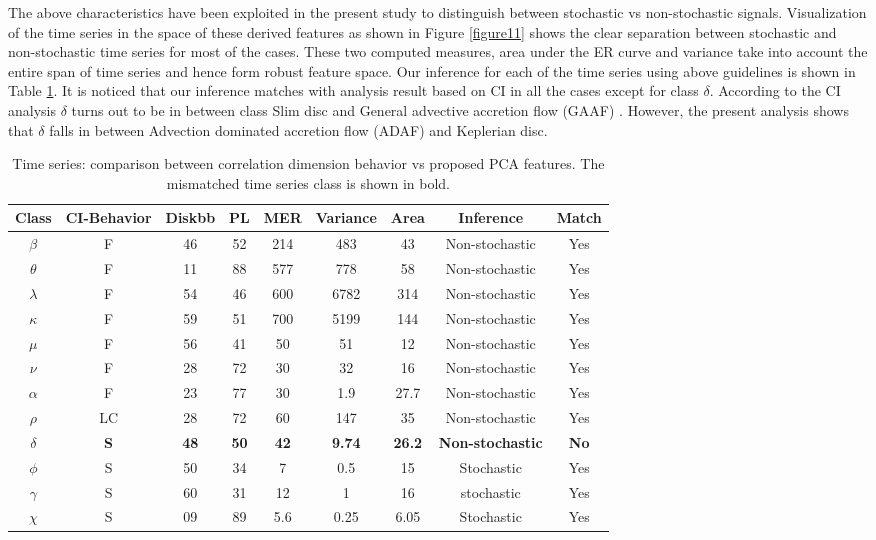 \documentclass[10pt,conference]{IEEEtran}
\begin{document}
The above characteristics have been exploited in the present study to distinguish between stochastic vs non-stochastic signals. Visualization of the time series in the space of these derived features as shown in Figure \ref{figure11} shows the clear separation between stochastic and non-stochastic time series for most of the cases. These two computed measures, area under the ER curve and variance take into account the entire span of time series and hence form robust feature space. Our inference for each of the time series using above guidelines is shown in Table \ref{tab:results}. It is noticed that our inference matches with analysis result based on CI in all the cases except for class $\delta$. According to the CI analysis $\delta$ turns out to be in between class Slim disc and General advective accretion flow (GAAF) \cite{Adegoke2018}. However, the present analysis shows that $\delta$ falls in between Advection dominated accretion flow (ADAF) and Keplerian disc.


\begin{table}[t]
\caption{Time series: comparison between correlation dimension behavior vs proposed PCA features. The mismatched time series class is shown in bold.}
\begin{center}
\begin{tabular}{|c|c|c|c|c|c|c|c|c|}
\hline
Class & CI-Behavior & Diskbb & PL & MER & Variance & Area & Inference & Match\\
\hline
$\beta$ & F & 46 & 52 & 214 & 483 & 43 & Non-stochastic & Yes \\
\hline
$\theta$ & F & 11 &  88 & 577 & 778 & 58&Non-stochastic & Yes \\
\hline
$\lambda$ & F & 54 & 46 & 600 & 6782 & 314 & Non-stochastic & Yes \\
\hline
$\kappa$ & F & 59 & 51 & 700 & 5199 & 144 & Non-stochastic & Yes \\
\hline
$\mu$ & F & 56 & 41 & 50 & 51 & 12 & Non-stochastic & Yes \\
\hline
$\nu$ & F & 28 & 72 & 30 & 32 & 16 & Non-stochastic & Yes \\
\hline
$\alpha$ & F & 23 & 77 & 30 & 1.9 & 27.7 & Non-stochastic & Yes \\
\hline
$\rho$ & LC & 28 & 72 & 60 & 147 & 35 & Non-stochastic & Yes \\
\hline
\textbf{$\delta$} & \textbf{S} & \textbf{48} & \textbf{50} & \textbf{42} & \textbf{9.74} & \textbf{26.2} & \textbf{Non-stochastic} & \textbf{No} \\
\hline
$\phi$ & S & 50 & 34 & 7 & 0.5 & 15 & Stochastic & Yes \\
\hline
$\gamma$ & S & 60 & 31 & 12 & 1 & 16 & stochastic & Yes \\
\hline
$\chi$ & S & 09 & 89 & 5.6 & 0.25 & 6.05 & Stochastic & Yes \\
\hline
\end{tabular}
\label{tab:results}
\end{center}
\end{table}
\end{document}
